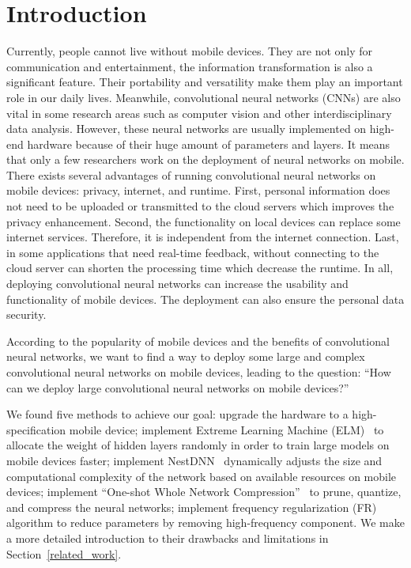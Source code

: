 \documentclass[runningheads]{llncs}
\begin{document}
\section{Introduction}

Currently, people cannot live without mobile devices. They are not only for communication and entertainment, the information transformation is also a significant feature. Their portability and versatility make them play an important role in our daily lives. Meanwhile, convolutional neural networks (CNNs) are also vital in some research areas such as computer vision and other interdisciplinary data analysis. However, these neural networks are usually implemented on high-end hardware because of their huge amount of parameters and layers. It means that only a few researchers work on the deployment of neural networks on mobile. There exists several advantages of running convolutional neural networks on mobile devices: privacy, internet, and runtime. First, personal information does not need to be uploaded or transmitted to the cloud servers which improves the privacy enhancement. Second, the functionality on local devices can replace some internet services. Therefore, it is independent from the internet connection. Last, in some applications that need real-time feedback, without connecting to the cloud server can shorten the processing time which decrease the runtime. In all, deploying convolutional neural networks can increase the usability and functionality of mobile devices. The deployment can also ensure the personal data security.

According to the popularity of mobile devices and the benefits of convolutional neural networks, we want to find a way to deploy some large and complex convolutional neural networks on mobile devices, leading to the question: ``How can we deploy large convolutional neural networks on mobile devices?''

We found five methods to achieve our goal: upgrade the hardware to a high-specification mobile device; implement Extreme Learning Machine (ELM)~\cite{anton2021elm} to allocate the weight of hidden layers randomly in order to train large models on mobile devices faster; implement NestDNN~\cite{fang2018nestdnn} dynamically adjusts the size and computational complexity of the network based on available resources on mobile devices; implement ``One-shot Whole Network Compression''~\cite{kim2016oneshot} to prune, quantize, and compress the neural networks; implement frequency regularization (FR)~\cite{zhao2023fr} algorithm to reduce parameters by removing high-frequency component. We make a more detailed introduction to their drawbacks and limitations in Section~\ref{related_work}.
\end{document}
